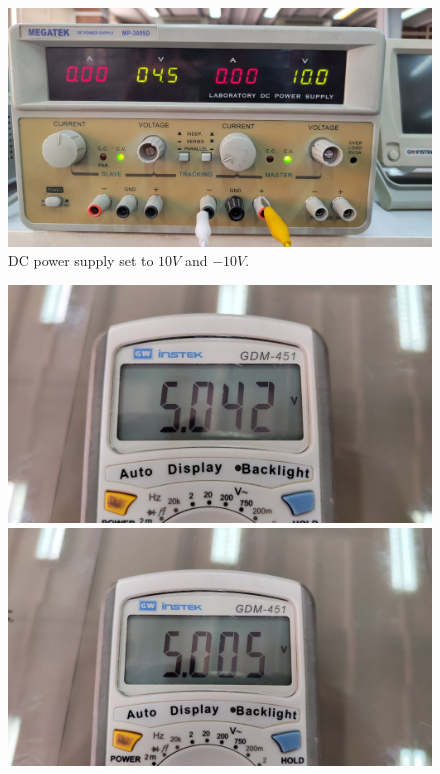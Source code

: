 \documentclass[11pt]{article}
\newcommand{\PicScale}{0.2}
\begin{document}
\begin{question}
\begin{subquestion}
{            \begin{figure}[H]
                \centering
                \includegraphics[scale=\PicScale,angle=0]{Fig/9.jpeg}
                \caption{DC power supply set to $10V$ and $-10V$.}
            \end{figure}
            \begin{figure}[H]
                \centering
                \includegraphics[scale=0.08,angle=0]{Fig/10.jpeg}
                \includegraphics[scale=0.08,angle=0]{Fig/11.jpeg}

\end{figure}}
\end{subquestion}
\end{question}
\end{document}
